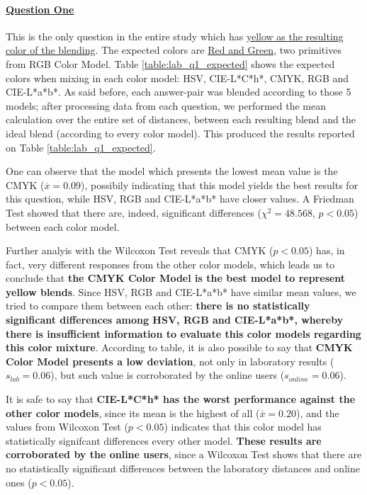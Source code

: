 \paragraph{\ul{Question One}}
%
This is the only question in the entire study which has \ul{yellow as the resulting color of the blending}. The expected colors are \ul{Red and Green},
two primitives from RGB Color Model. Table \ref{table:lab_q1_expected} shows the expected colors when mixing in each color model: HSV, CIE-L*C*h*, CMYK,
RGB and CIE-L*a*b*. As said before, each answer-pair was blended according to those 5 models; after processing data from each question, we performed the
mean calculation over the entire set of distances, between each resulting blend and the ideal blend (according to every color model). This produced the
results reported on Table \ref{table:lab_q1_expected}. \par
%
One can observe that the model which presents the lowest mean value is the CMYK ($\overline{x} = 0.09$), possibily indicating that this model yields
the best results for this question, while HSV, RGB and CIE-L*a*b* have closer values. A Friedman Test showed that there are, indeed, significant
differences ($\chi^2 = 48.568$, $p < 0.05$) between each color model. \par
%
Further analyis with the Wilcoxon Test reveals that CMYK ($p < 0.05$) has, in fact, very different responses from the other color models, which leads
us to conclude that \textbf{the CMYK Color Model is the best model to represent yellow blends}. Since HSV, RGB and CIE-L*a*b* have similar mean values,
we tried to compare them between each other: \textbf{there is no statistically significant differences among HSV, RGB and CIE-L*a*b*, whereby there is insufficient
information to evaluate this color models regarding this color mixture}. According to table, it is also possible to say that \textbf{CMYK Color Model
presents a low deviation}, not only in laboratory results ($s_{lab} = 0.06$), but such value is corroborated by the online users ($s_{online} = 0.06$). \par
%
It is safe to say that \textbf{CIE-L*C*h* has the worst performance against the other color models}, since its mean is the highest of all
($\overline{x} = 0.20$), and the values from Wilcoxon Test ($p < 0.05$) indicates that this color model has statistically signifcant differences every
other model. \textbf{These results are corroborated by the online users}, since a Wilcoxon Test shows that there are no statistically significant
differences between the laboratory distances and online ones ($p < 0.05$).
